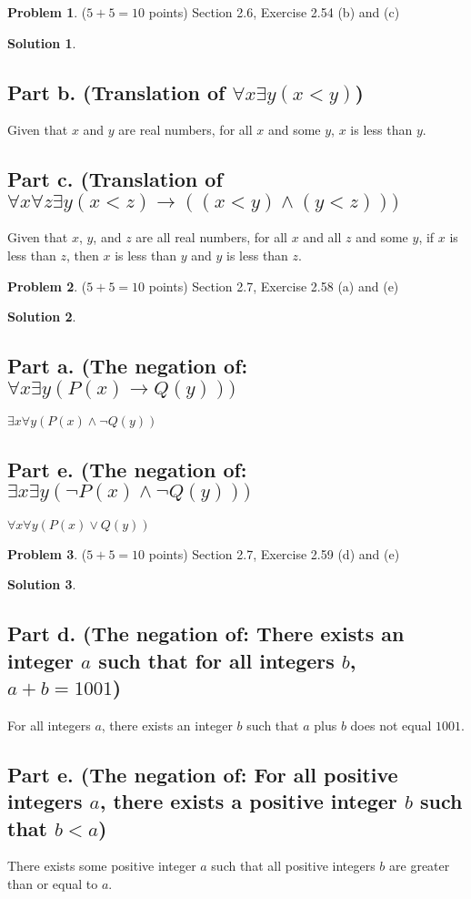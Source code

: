 \documentclass{article}
\theoremstyle{definition}
\newtheorem{problem}{Problem}
\newtheorem*{solution}{Solution}
\begin{document}
\newpage
\begin{problem} ($5+5=10$ points) Section 2.6, Exercise 2.54 (b) and (c)
\end{problem}
\begin{solution} 
\hspace{1cm}
\subsection*{Part b. (Translation of $\forall x \exists y(x<y)$)}
Given that $x$ and $y$ are real numbers, for all $x$ and some $y$, $x$ is less than $y$.
\subsection*{Part c. (Translation of $\forall x \forall z \exists y(x < z) \rightarrow ((x < y) \land (y < z)))$}
Given that $x$, $y$, and $z$ are all real numbers, for all $x$ and all $z$ and some $y$, if $x$ is less than $z$, then $x$ is less than $y$ and $y$ is less than $z$.
\end{solution}

\newpage
\begin{problem} ($5+5=10$ points) Section 2.7, Exercise 2.58 (a) and (e)
\end{problem}
\begin{solution}
\hspace{1cm}
\subsection*{Part a. (The negation of: $\forall x \exists y (P(x) \rightarrow Q(y)))$}
\large{$\exists x \forall y (P(x) \land \neg Q(y))$}
\subsection*{Part e. (The negation of: $\exists x \exists y (\neg P(x) \land \neg Q(y)))$}
\large{$\forall x \forall y (P(x) \lor Q(y))$}
\end{solution}

\newpage
\begin{problem} ($5+5=10$ points) Section 2.7, Exercise 2.59 (d) and (e)
\end{problem}
\begin{solution}
\hspace{1cm}
\subsection*{Part d. (The negation of: There exists an integer $a$ such that for all integers $b$, $a + b =1001$)}
For all integers $a$, there exists an integer $b$ such that $a$ plus $b$ does not equal $1001$.
\subsection*{Part e. (The negation of: For all positive integers $a$, there exists a positive integer $b$ such that $b < a$)}
There exists some positive integer $a$ such that all positive integers $b$ are greater than or equal to $a$.
\end{solution}
\end{document}
